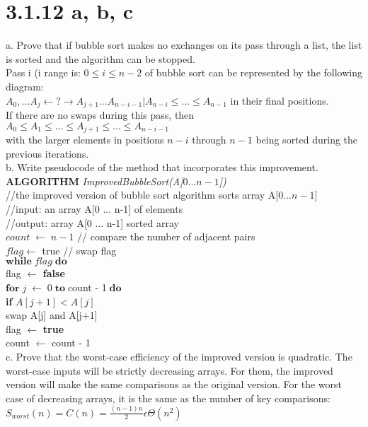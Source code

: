 \documentclass[8pt, letterpaper]{article}
\begin{document}
\section{3.1.12 a, b, c}
a. Prove that if bubble sort makes no exchanges on its pass through a list, the
list is sorted and the algorithm can be stopped. \\
\indent Pass i (i range is: $0 \le i \le n-2$ of bubble sort can be represented by the following diagram: \\
$A_{0}, ... A_{j} \leftarrow ? \rightarrow A_{j+1} ... A_{n-i-1} | A_{n-i} \le ... \le A_{n-1}$ in their final positions. \\
If there are no swaps during this pass, then \\
$A_0 \le A_1 \le ... \le A_{j+1} \le ... \le A_{n-i-1}$ \\
with the larger elements in positions $n-i$ through $n-1$ being sorted during the previous iterations.\\
b. Write pseudocode of the method that incorporates this improvement. \\
\textbf{ALGORITHM} \textit{ImprovedBubbleSort(A[$0...n-1$])} \\
\indent //the improved version of bubble sort algorithm sorts array A[$0 ... n-1$] \\
\indent //input: an array A[0 ... n-1] of elements \\
\indent //output: array A[0 ... n-1] sorted array \\
\indent $count\; \leftarrow \; n-1$ // compare the number of adjacent pairs \\
\indent $flag \leftarrow$ true // swap flag\\
\indent $\textbf{while} \; flag \; \textbf{do}$ \\
\indent \indent flag $\leftarrow$ \textbf{false} \\
\indent \indent $\textbf{for}\; j \; \leftarrow \; 0 \; \textbf{to} \; $count - 1$ \; \textbf{do}$ \\
\indent \indent \indent \textbf{if} $A[j+1] < A[j]$ \\
\indent \indent \indent \indent swap A[j] and A[j+1] \\
\indent \indent \indent \indent flag $\leftarrow$ \textbf{true} \\
\indent \indent \indent count $\leftarrow$ count - 1 \\
c. Prove that the worst-case efficiency of the improved version is quadratic.
\indent The worst-case inputs will be strictly decreasing arrays. For them, the improved version will make the same comparisons as the original version. For the worst case of decreasing arrays, it is the same as the number of key comparisons: \\
$S_{worst} (n) = C(n) = \frac{(n-1)n}{2} \epsilon \Theta(n^2)$ 
\end{document}
